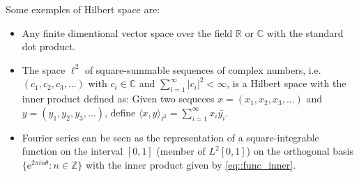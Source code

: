 Some exemples of Hilbert space are:

\begin{itemize}
  \item Any finite dimentional vector space over the field $\mathbb{R}$ or
  $\mathbb{C}$ with the standard dot product.
  \item The space $\ell^2$ of square-summable sequences of complex numbers, i.e.
  $(c_1,c_2,c_3,\ldots)$ with $c_i \in \mathbb{C}$ and $\sum_{i=1}^\infty |c_i|^2 <
  \infty$, is a Hilbert space with the inner product defined as: Given two sequeces
  $x=(x_1,x_2,x_3,\ldots)$ and $y=(y_1,y_2,y_3,\ldots)$, define $\langle x,y
  \rangle_{\scriptscriptstyle \ell^2} = \sum_{i=1}^\infty x_i \bar{y_i}$.
  \item Fourier series can be seen as the representation of a square-integrable
  function on the interval $[0,1]$ (member of $L^2[0,1]$) on the orthogonal
  basis $\{\mathrm{e}^{2\pi i n \theta} : n \in \mathbb{Z}\}$ with the
  inner product given by \ref{eq::func_inner}.
\end{itemize}

